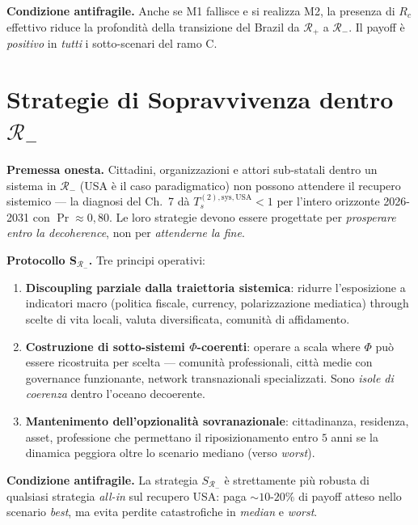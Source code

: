 \Proved{} \textbf{Condizione antifragile.} Anche se M1 fallisce e si
realizza M2, la presenza di \(R_c\) effettivo riduce la profondità della
transizione del Brazil da \(\mathcal{R}_+\) a \(\mathcal{R}_-\). Il
payoff è \emph{positivo} in \emph{tutti} i sotto-scenari del ramo C.



\section{\texorpdfstring{Strategie di Sopravvivenza dentro
\(\mathcal{R}_-\)}{Strategie di Sopravvivenza dentro \textbackslash mathcal\{R\}\_-}}\label{strategie-di-sopravvivenza-dentro-mathcalr_-}

\Hypoth{} \textbf{Premessa onesta.} Cittadini, organizzazioni e attori
sub-statali dentro un sistema in \(\mathcal{R}_-\) (USA è il caso
paradigmatico) non possono attendere il recupero sistemico --- la
diagnosi del Ch.~7 dà \(T_s^{(2),\text{sys},\text{USA}} < 1\) per
l'intero orizzonte 2026-2031 con \(\Pr \approx 0{,}80\). Le loro
strategie devono essere progettate per \emph{prosperare entro la
decoherence}, non per \emph{attenderne la fine}.

\Hypoth{} \textbf{Protocollo S\(_{\mathcal{R}_-}\).} Tre principi
operativi:

\begin{enumerate}
\def\labelenumi{\arabic{enumi}.}
\tightlist
\item
  \textbf{Discoupling parziale dalla traiettoria sistemica}:
  ridurre l'esposizione a indicatori macro (politica fiscale, currency,
  polarizzazione mediatica) through scelte di vita locali, valuta
  diversificata, comunità di affidamento.
\item
  \textbf{Costruzione di sotto-sistemi \(\Phi\)-coerenti}: operare a
  scala where \(\Phi\) può essere ricostruita per scelta --- comunità
  professionali, città medie con governance funzionante, network
  transnazionali specializzati. Sono \emph{isole di coerenza} dentro
  l'oceano decoerente.
\item
  \textbf{Mantenimento dell'opzionalità sovranazionale}: cittadinanza,
  residenza, asset, professione che permettano il riposizionamento entro
  \(5\) anni se la dinamica peggiora oltre lo scenario mediano (verso
  \emph{worst}).
\end{enumerate}

\Proved{} \textbf{Condizione antifragile.} La strategia
\(S_{\mathcal{R}_-}\) è strettamente più robusta di qualsiasi strategia
\emph{all-in} sul recupero USA: paga \(\sim 10\)-\(20\%\) di payoff
atteso nello scenario \emph{best}, ma evita perdite catastrofiche in
\emph{median} e \emph{worst}.



